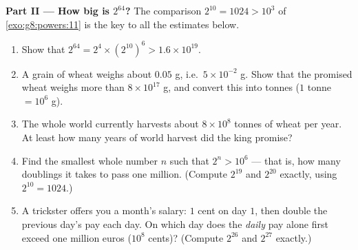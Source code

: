 \begin{problem}[{Weekend problem --- the geometric \omterm{def:g1:addition:def}{sum}
$1 + 2 + 4 + \dots + 2^{n-1} = 2^n - 1$, from a famous legend to
binary numbers}]
\medskip
\noindent\textbf{Part II --- How big is $2^{64}$?}
The comparison $2^{10} = 1024 > 10^3$ of
\cref{exo:g8:powers:11} is the key to all the estimates below.
\begin{enumerate}[resume]
  \item Show that
        $2^{64} = 2^4 \times \left(2^{10}\right)^6 > 1.6 \times
        10^{19}$.
  \item A grain of wheat weighs about $0.05$ g, i.e.\
        $5 \times 10^{-2}$ g. Show that the promised wheat weighs
        more than $8 \times 10^{17}$ g, and convert this into
        tonnes ($1$ tonne $= 10^6$ g).
  \item The whole world currently harvests about $8 \times 10^8$
        tonnes of wheat per year. At least how many years of world
        harvest did the king promise?
  \item Find the smallest whole number $n$ such that
        $2^n > 10^6$ --- that is, how many doublings it takes to
        pass one million. (Compute $2^{19}$ and $2^{20}$ exactly,
        using $2^{10} = 1024$.)
  \item A trickster offers you a month's salary: $1$ cent on day
        $1$, then double the previous day's pay each day. On which
        day does the \emph{daily} pay alone first exceed one
        million euros ($10^8$ cents)? (Compute $2^{26}$ and
        $2^{27}$ exactly.)
\end{enumerate}


\end{problem}
